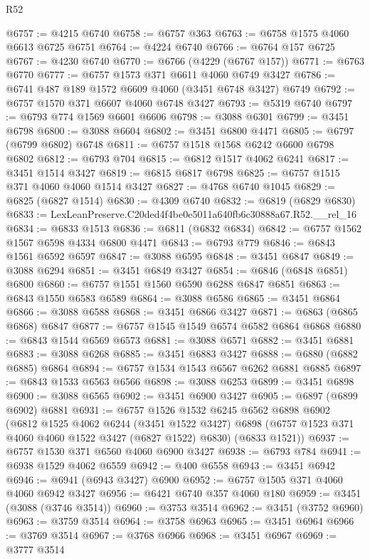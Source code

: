 \begin{lexlean}{R52}
\begin{coremodule}
@6757 := @4215 @6740
@6758 := @6757 @363
@6763 := @6758 @1575 @4060 @6613 @6725 @6751
@6764 := @4224 @6740
@6766 := @6764 @157 @6725
@6767 := @4230 @6740
@6770 := @6766 (@4229 (@6767 @157))
@6771 := @6763 @6770
@6777 := @6757 @1573 @371 @6611 @4060 @6749 @3427
@6786 := @6741 @487 @189 @1572 @6609 @4060 (@3451 @6748 @3427) @6749
@6792 := @6757 @1570 @371 @6607 @4060 @6748 @3427
@6793 := @5319 @6740
@6797 := @6793 @774 @1569 @6601 @6606
@6798 := @3088 @6301
@6799 := @3451 @6798
@6800 := @3088 @6604
@6802 := @3451 @6800 @4471
@6805 := @6797 (@6799 @6802) @6748
@6811 := @6757 @1518 @1568 @6242 @6600 @6798 @6802
@6812 := @6793 @704
@6815 := @6812 @1517 @4062 @6241
@6817 := @3451 @1514 @3427
@6819 := @6815 @6817 @6798
@6825 := @6757 @1515 @371 @4060 @4060 @1514 @3427
@6827 := @4768 @6740 @1045
@6829 := @6825 (@6827 @1514)
@6830 := @4309 @6740
@6832 := @6819 (@6829 @6830)
@6833 := LexLeanPreserve.C20ded4f4be0e5011a640fb6c30888a67.R52.__rel_16
@6834 := @6833 @1513
@6836 := @6811 (@6832 @6834)
@6842 := @6757 @1562 @1567 @6598 @4334 @6800 @4471
@6843 := @6793 @779
@6846 := @6843 @1561 @6592 @6597
@6847 := @3088 @6595
@6848 := @3451 @6847
@6849 := @3088 @6294
@6851 := @3451 @6849 @3427
@6854 := @6846 (@6848 @6851) @6800
@6860 := @6757 @1551 @1560 @6590 @6288 @6847 @6851
@6863 := @6843 @1550 @6583 @6589
@6864 := @3088 @6586
@6865 := @3451 @6864
@6866 := @3088 @6588
@6868 := @3451 @6866 @3427
@6871 := @6863 (@6865 @6868) @6847
@6877 := @6757 @1545 @1549 @6574 @6582 @6864 @6868
@6880 := @6843 @1544 @6569 @6573
@6881 := @3088 @6571
@6882 := @3451 @6881
@6883 := @3088 @6268
@6885 := @3451 @6883 @3427
@6888 := @6880 (@6882 @6885) @6864
@6894 := @6757 @1534 @1543 @6567 @6262 @6881 @6885
@6897 := @6843 @1533 @6563 @6566
@6898 := @3088 @6253
@6899 := @3451 @6898
@6900 := @3088 @6565
@6902 := @3451 @6900 @3427
@6905 := @6897 (@6899 @6902) @6881
@6931 := @6757
    @1526
    @1532
    @6245
    @6562
    @6898
    @6902
    (@6812
      @1525
      @4062
      @6244
      (@3451 @1522 @3427)
      @6898
      (@6757 @1523 @371 @4060 @4060 @1522 @3427 (@6827 @1522) @6830)
      (@6833 @1521))
@6937 := @6757 @1530 @371 @6560 @4060 @6900 @3427
@6938 := @6793 @784
@6941 := @6938 @1529 @4062 @6559
@6942 := @400 @6558
@6943 := @3451 @6942
@6946 := @6941 (@6943 @3427) @6900
@6952 := @6757 @1505 @371 @4060 @4060 @6942 @3427
@6956 := @6421 @6740 @357 @4060 @180
@6959 := @3451 (@3088 (@3746 @3514))
@6960 := @3753 @3514
@6962 := @3451 (@3752 @6960)
@6963 := @3759 @3514
@6964 := @3758 @6963
@6965 := @3451 @6964
@6966 := @3769 @3514
@6967 := @3768 @6966
@6968 := @3451 @6967
@6969 := @3777 @3514

\end{coremodule}
\end{lexlean}
